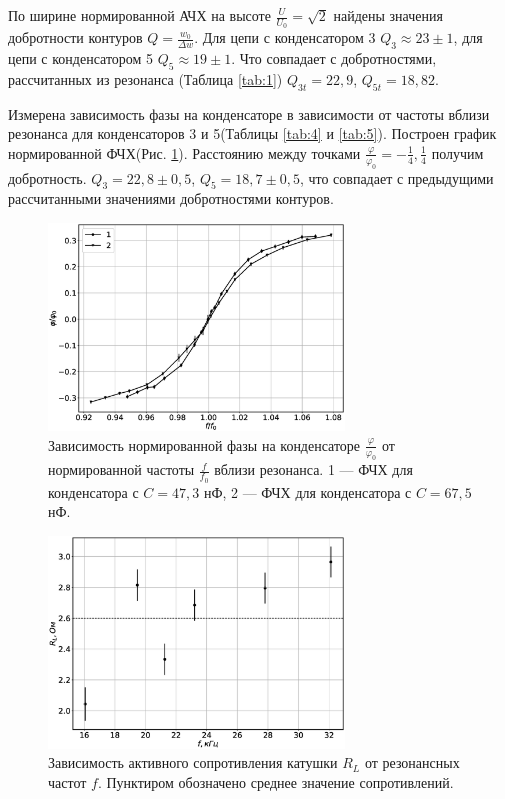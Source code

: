 \documentclass[12pt]{article}
\begin{document}
По ширине нормированной АЧХ на высоте $\frac{U}{U_0} = \sqrt{2}$ найдены значения добротности контуров $Q = \frac{w_0}{\Delta w}$.
Для цепи с конденсатором 3 $Q_3 \approx 23 \pm 1$, для цепи с конденсатором 5 $Q_5 \approx 19 \pm 1$. Что совпадает с добротностями,
рассчитанных из резонанса (Таблица \ref{tab:1}) $Q_{3t} = 22,9$, $Q_{5t} = 18,82$.

Измерена зависимость фазы на конденсаторе в зависимости от частоты вблизи резонанса для конденсаторов 3 и 5(Таблицы \ref{tab:4} и \ref{tab:5}).
Построен график нормированной ФЧХ(Рис. \ref{fig:pf}). Расстоянию между точками $\frac{\varphi}{\varphi_0} = -\frac{1}{4}, \frac{1}{4}$ получим
добротность. $Q_3 = 22,8 \pm 0,5$, $Q_5 = 18,7 \pm 0,5$, что совпадает с предыдущими рассчитанными значениями добротностями контуров.

\begin{figure}
    \centering
    \includegraphics[width=0.7\textwidth]{pf_norm.eps}
    \caption{Зависимость нормированной фазы на конденсаторе $\frac{\varphi}{\varphi_0}$ от нормированной частоты $\frac{f}{f_0}$ вблизи резонанса. 1 --- ФЧХ для конденсатора
        с $C = 47,3$ нФ, 2 --- ФЧХ для конденсатора с $C = 67,5$ нФ.}
    \label{fig:pf}
\end{figure}

\begin{figure}
    \centering
    \includegraphics[width=0.7\textwidth]{RLf.eps}
    \caption{Зависимость активного сопротивления катушки $R_L$ от резонансных частот $f$. Пунктиром обозначено
        среднее значение сопротивлений.}
    \label{fig:RLf}
\end{figure}
\end{document}
